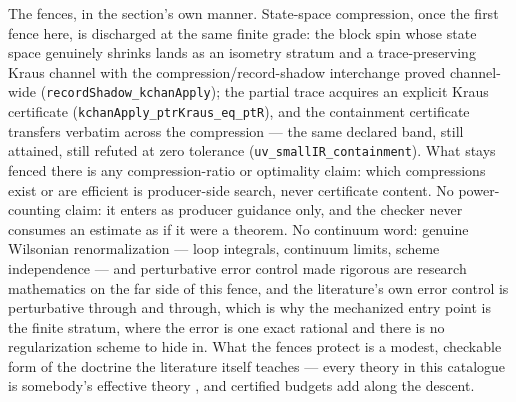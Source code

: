 The fences, in the section's own manner. State-space compression,
once the first fence here, is discharged at the same finite grade:
the block spin whose state space genuinely shrinks lands as an
isometry stratum and a trace-preserving Kraus channel with the
compression/record-shadow interchange proved channel-wide
(\texttt{recordShadow\_kchanApply}); the partial trace acquires an
explicit Kraus certificate (\texttt{kchanApply\_ptrKraus\_eq\_ptR}),
and the containment certificate transfers verbatim across the
compression --- the same declared band, still attained, still
refuted at zero tolerance (\texttt{uv\_smallIR\_containment}). What
stays fenced there is any compression-ratio or optimality claim:
which compressions exist or are efficient is producer-side search,
never certificate content. No power-counting claim: it enters
as producer guidance only, and the checker never consumes an
estimate as if it were a theorem. No continuum word: genuine
Wilsonian renormalization --- loop integrals, continuum limits,
scheme independence --- and perturbative error control made rigorous
are research mathematics on the far side of this fence, and the
literature's own error control is perturbative through and through,
which is why the mechanized entry point is the finite stratum, where
the error is one exact rational and there is no regularization
scheme to hide in. What the fences protect is a modest, checkable
form of the doctrine the literature itself teaches --- every theory
in this catalogue is somebody's effective theory \cite{penco20}, and
certified budgets add along the descent.

